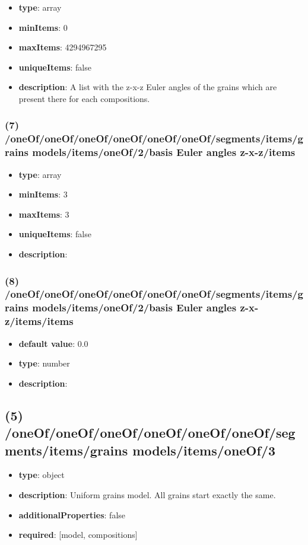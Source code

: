 \begin{itemize}[leftmargin=6em]\item {\bf type}: array
\item {\bf minItems}: 0
\item {\bf maxItems}: 4294967295
\item {\bf uniqueItems}: false
\item {\bf description}: A list with the z-x-z Euler angles of the grains which are present there for each compositions.
\end{itemize}\subsubsection{(7) /oneOf/oneOf/oneOf/oneOf/oneOf/oneOf/segments/items/grains models/items/oneOf/2/basis Euler angles z-x-z/items}
\begin{itemize}[leftmargin=7em]\item {\bf type}: array
\item {\bf minItems}: 3
\item {\bf maxItems}: 3
\item {\bf uniqueItems}: false
\item {\bf description}: 
\end{itemize}\subsubsection{(8) /oneOf/oneOf/oneOf/oneOf/oneOf/oneOf/segments/items/grains models/items/oneOf/2/basis Euler angles z-x-z/items/items}
\begin{itemize}[leftmargin=8em]\item {\bf default value}: 0.0
\item {\bf type}: number
\item {\bf description}: 
\end{itemize}\subsection{(5) /oneOf/oneOf/oneOf/oneOf/oneOf/oneOf/segments/items/grains models/items/oneOf/3}
\begin{itemize}[leftmargin=5em]\item {\bf type}: object
\item {\bf description}: Uniform grains model. All grains start exactly the same.
\item {\bf additionalProperties}: false
\item {\bf required}: [model, compositions]\end{itemize}
